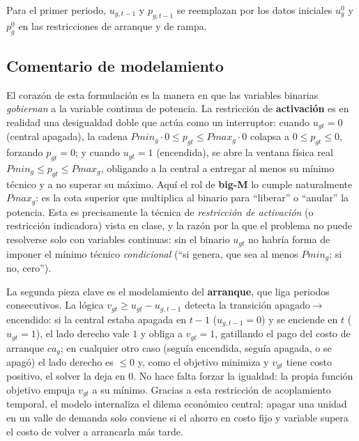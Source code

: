 \documentclass[11pt]{article}
\begin{document}
\noindent Para el primer periodo, $u_{g,t-1}$ y $p_{g,t-1}$ se reemplazan por los datos iniciales $u^0_g$ y $p^0_g$ en las restricciones de arranque y de rampa.

\subsection*{Comentario de modelamiento}

El corazón de esta formulación es la manera en que las variables binarias \emph{gobiernan} a la variable continua de potencia. La restricción de \textbf{activación} es en realidad una desigualdad doble que actúa como un interruptor: cuando $u_{gt}=0$ (central apagada), la cadena $\mathit{Pmin}_g\cdot 0 \le p_{gt} \le \mathit{Pmax}_g\cdot 0$ colapsa a $0 \le p_{gt} \le 0$, forzando $p_{gt}=0$; y cuando $u_{gt}=1$ (encendida), se abre la ventana física real $\mathit{Pmin}_g \le p_{gt} \le \mathit{Pmax}_g$, obligando a la central a entregar al menos su mínimo técnico y a no superar su máximo. Aquí el rol de \textbf{big-M} lo cumple naturalmente $\mathit{Pmax}_g$: es la cota superior que multiplica al binario para ``liberar'' o ``anular'' la potencia. Esta es precisamente la técnica de \emph{restricción de activación} (o restricción indicadora) vista en clase, y la razón por la que el problema no puede resolverse solo con variables continuas: sin el binario $u_{gt}$ no habría forma de imponer el mínimo técnico \emph{condicional} (``si genera, que sea al menos $\mathit{Pmin}_g$; si no, cero'').

La segunda pieza clave es el modelamiento del \textbf{arranque}, que liga periodos consecutivos. La lógica $v_{gt} \ge u_{gt} - u_{g,t-1}$ detecta la transición apagado$\to$encendido: si la central estaba apagada en $t-1$ ($u_{g,t-1}=0$) y se enciende en $t$ ($u_{gt}=1$), el lado derecho vale $1$ y obliga a $v_{gt}=1$, gatillando el pago del costo de arranque $\mathit{ca}_g$; en cualquier otro caso (seguía encendida, seguía apagada, o se apagó) el lado derecho es $\le 0$ y, como el objetivo minimiza y $v_{gt}$ tiene costo positivo, el solver la deja en $0$. No hace falta forzar la igualdad: la propia función objetivo empuja $v_{gt}$ a su mínimo. Gracias a esta restricción de acoplamiento temporal, el modelo internaliza el dilema económico central: apagar una unidad en un valle de demanda solo conviene si el ahorro en costo fijo y variable supera el costo de volver a arrancarla más tarde.
\end{document}
